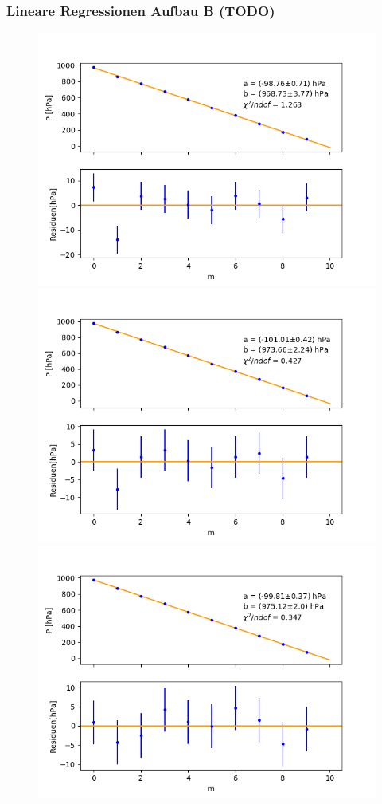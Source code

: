 \documentclass[12pt,a4paper]{article}
\begin{document}
\subsubsection{Lineare Regressionen Aufbau B (TODO)}
\begin{figure}
\centering
\includegraphics[scale=0.5]{Bilder/Druck_A_Var2_2.png}
\includegraphics[scale=0.5]{Bilder/Druck_A_Var2_3.png}
\includegraphics[scale=0.5]{Bilder/Druck_A_Var2_4.png}

\end{figure}
\end{document}
